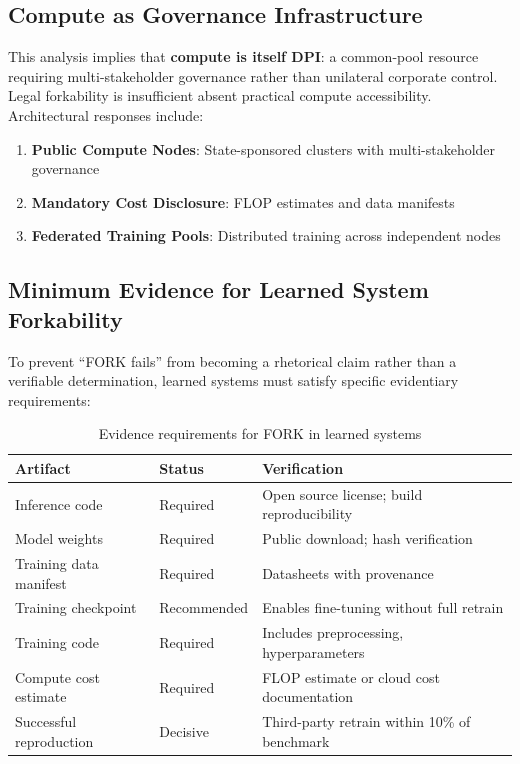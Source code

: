 \documentclass{article}
\theoremstyle{definition}
\begin{document}
\subsection{Compute as Governance Infrastructure}

This analysis implies that \textbf{compute is itself DPI}: a common-pool resource requiring multi-stakeholder governance rather than unilateral corporate control. Legal forkability is insufficient absent practical compute accessibility. Architectural responses include:
\begin{enumerate}[noitemsep]
    \item \textbf{Public Compute Nodes}: State-sponsored clusters with multi-stakeholder governance
    \item \textbf{Mandatory Cost Disclosure}: FLOP estimates and data manifests
    \item \textbf{Federated Training Pools}: Distributed training across independent nodes
\end{enumerate}

\subsection{Minimum Evidence for Learned System Forkability}
\label{subsec:fork-evidence}

To prevent ``FORK fails'' from becoming a rhetorical claim rather than a verifiable determination, learned systems must satisfy specific evidentiary requirements:

\begin{table}[htbp]
\centering
\small
\caption{Evidence requirements for FORK in learned systems}
\label{tab:ai-fork-evidence}
\begin{tabular}{@{}llp{5.5cm}@{}}
\toprule
\textbf{Artifact} & \textbf{Status} & \textbf{Verification} \\
\midrule
Inference code & Required & Open source license; build reproducibility \\
Model weights & Required & Public download; hash verification \\
Training data manifest & Required & Datasheets \citep{gebru2021} with provenance \\
Training checkpoint & Recommended & Enables fine-tuning without full retrain \\
Training code & Required & Includes preprocessing, hyperparameters \\
Compute cost estimate & Required & FLOP estimate or cloud cost documentation \\
Successful reproduction & Decisive & Third-party retrain within 10\% of benchmark \\
\bottomrule
\end{tabular}
\end{table}
\end{document}
